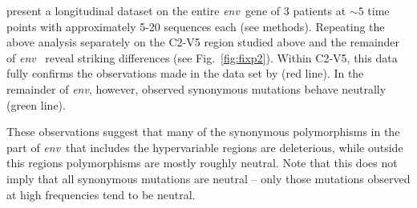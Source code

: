 \documentclass[rmp, twocolumn]{revtex4}
\newcommand{\FIG}[1]{Fig.~\ref{fig:#1}}
\newcommand{\env}{\textit{env}}
\begin{document}
\citet{bunnik_autologous_2008} present a longitudinal dataset on the entire
\env~gene of 3 patients at $\sim 5$ time points with approximately 5-20
sequences each (see methods). Repeating the above analysis separately on the
C2-V5 region studied above and the remainder of \env~ reveal striking
differences (see \FIG{fixp2}). Within C2-V5, this data fully confirms the
observations made in the data set by \citet{shankarappa_consistent_1999} (red
line). In the remainder of \env, however, observed synonymous mutations behave
neutrally (green line). 

These observations suggest that many of the synonymous polymorphisms in the part
of \env~that includes the hypervariable regions are deleterious, while outside
this regions polymorphisms are mostly roughly neutral. Note that this does not imply that all 
synonymous mutations are neutral -- only those mutations observed at high frequencies tend 
to be neutral.
\end{document}
